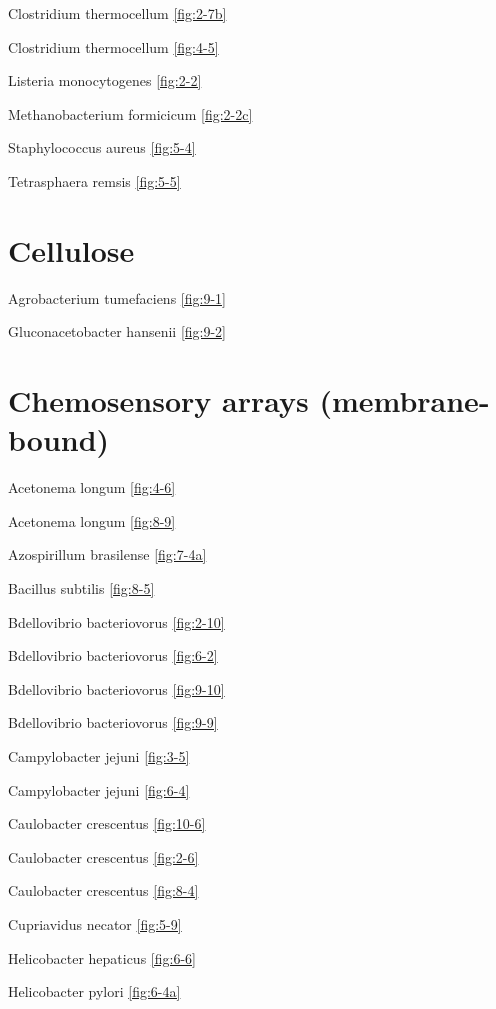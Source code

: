 \documentclass[]{tufte-book}
\begin{document}
Clostridium thermocellum \ref{fig:2-7b}

Clostridium thermocellum \ref{fig:4-5}

Listeria monocytogenes \ref{fig:2-2}

Methanobacterium formicicum \ref{fig:2-2c}

Staphylococcus aureus \ref{fig:5-4}

Tetrasphaera remsis \ref{fig:5-5}

\hypertarget{cellulose}{%
\section*{Cellulose}\label{cellulose}}

Agrobacterium tumefaciens \ref{fig:9-1}

Gluconacetobacter hansenii \ref{fig:9-2}

\hypertarget{chemosensory-arrays-membrane-bound}{%
\section*{Chemosensory arrays (membrane-bound)}\label{chemosensory-arrays-membrane-bound}}

Acetonema longum \ref{fig:4-6}

Acetonema longum \ref{fig:8-9}

Azospirillum brasilense \ref{fig:7-4a}

Bacillus subtilis \ref{fig:8-5}

Bdellovibrio bacteriovorus \ref{fig:2-10}

Bdellovibrio bacteriovorus \ref{fig:6-2}

Bdellovibrio bacteriovorus \ref{fig:9-10}

Bdellovibrio bacteriovorus \ref{fig:9-9}

Campylobacter jejuni \ref{fig:3-5}

Campylobacter jejuni \ref{fig:6-4}

Caulobacter crescentus \ref{fig:10-6}

Caulobacter crescentus \ref{fig:2-6}

Caulobacter crescentus \ref{fig:8-4}

Cupriavidus necator \ref{fig:5-9}

Helicobacter hepaticus \ref{fig:6-6}

Helicobacter pylori \ref{fig:6-4a}
\end{document}
